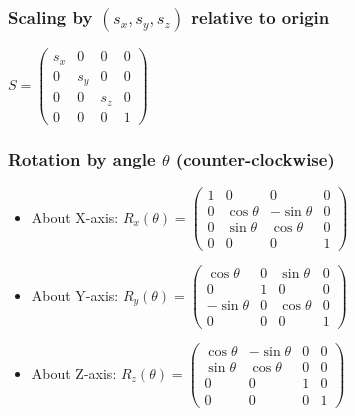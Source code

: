 \subsubsection*{Scaling by $(s_x, s_y, s_z)$ relative to origin}
$S = \begin{pmatrix} s_x & 0 & 0 & 0 \\ 0 & s_y & 0 & 0 \\ 0 & 0 & s_z & 0 \\ 0 & 0 & 0 & 1 \end{pmatrix}$

\subsubsection*{Rotation by angle $\theta$ (counter-clockwise)}
\begin{itemize}
    \item About X-axis:
    $R_x(\theta) = \begin{pmatrix} 1 & 0 & 0 & 0 \\ 0 & \cos\theta & -\sin\theta & 0 \\ 0 & \sin\theta & \cos\theta & 0 \\ 0 & 0 & 0 & 1 \end{pmatrix}$
    \item About Y-axis:
    $R_y(\theta) = \begin{pmatrix} \cos\theta & 0 & \sin\theta & 0 \\ 0 & 1 & 0 & 0 \\ -\sin\theta & 0 & \cos\theta & 0 \\ 0 & 0 & 0 & 1 \end{pmatrix}$
    \item About Z-axis:
    $R_z(\theta) = \begin{pmatrix} \cos\theta & -\sin\theta & 0 & 0 \\ \sin\theta & \cos\theta & 0 & 0 \\ 0 & 0 & 1 & 0 \\ 0 & 0 & 0 & 1 \end{pmatrix}$
\end{itemize}
